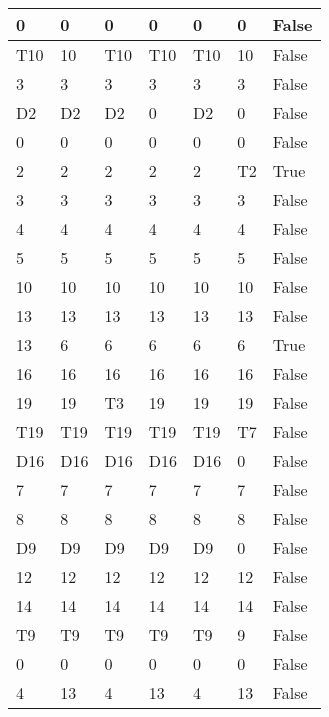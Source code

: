 \begin{longtable}[htbp]{| p{} | p{} | p{}| p{}| p{}| p{}| p{}|}
0 & 0 & 0 & 0 & 0 & 0 & False \\ \hline
\multicolumn{1}{|l|}{T10} & 10 & \multicolumn{1}{l|}{T10} & \multicolumn{1}{l|}{T10} & \multicolumn{1}{l|}{T10} & 10 & False \\ \hline
3 & 3 & 3 & 3 & 3 & 3 & False \\ \hline
\multicolumn{1}{|l|}{D2} & \multicolumn{1}{l|}{D2} & \multicolumn{1}{l|}{D2} & 0 & \multicolumn{1}{l|}{D2} & 0 & False \\ \hline
0 & 0 & 0 & 0 & 0 & 0 & False \\ \hline
2 & 2 & 2 & 2 & 2 & \multicolumn{1}{l|}{T2} & True \\ \hline
3 & 3 & 3 & 3 & 3 & 3 & False \\ \hline
4 & 4 & 4 & 4 & 4 & 4 & False \\ \hline
5 & 5 & 5 & 5 & 5 & 5 & False \\ \hline
10 & 10 & 10 & 10 & 10 & 10 & False \\ \hline
13 & 13 & 13 & 13 & 13 & 13 & False \\ \hline
13 & 6 & 6 & 6 & 6 & 6 & True \\ \hline
16 & 16 & 16 & 16 & 16 & 16 & False \\ \hline
19 & 19 & \multicolumn{1}{l|}{T3} & 19 & 19 & 19 & False \\ \hline
\multicolumn{1}{|l|}{T19} & \multicolumn{1}{l|}{T19} & \multicolumn{1}{l|}{T19} & \multicolumn{1}{l|}{T19} & \multicolumn{1}{l|}{T19} & \multicolumn{1}{l|}{T7} & False \\ \hline
\multicolumn{1}{|l|}{D16} & \multicolumn{1}{l|}{D16} & \multicolumn{1}{l|}{D16} & \multicolumn{1}{l|}{D16} & \multicolumn{1}{l|}{D16} & 0 & False \\ \hline
7 & 7 & 7 & 7 & 7 & 7 & False \\ \hline
8 & 8 & 8 & 8 & 8 & 8 & False \\ \hline
\multicolumn{1}{|l|}{D9} & \multicolumn{1}{l|}{D9} & \multicolumn{1}{l|}{D9} & \multicolumn{1}{l|}{D9} & \multicolumn{1}{l|}{D9} & 0 & False \\ \hline
12 & 12 & 12 & 12 & 12 & 12 & False \\ \hline
14 & 14 & 14 & 14 & 14 & 14 & False \\ \hline
\multicolumn{1}{|l|}{T9} & \multicolumn{1}{l|}{T9} & \multicolumn{1}{l|}{T9} & \multicolumn{1}{l|}{T9} & \multicolumn{1}{l|}{T9} & 9 & False \\ \hline
0 & 0 & 0 & 0 & 0 & 0 & False \\ \hline
4 & 13 & 4 & 13 & 4 & 13 & False \\ \hline

\end{longtable}
